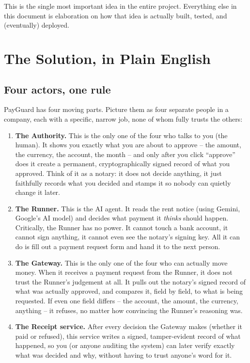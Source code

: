 \documentclass[11pt]{report}
\begin{document}
This is the single most important idea in the entire project. Everything
else in this document is elaboration on how that idea is actually built,
tested, and (eventually) deployed.

\chapter{The Solution, in Plain English}
\label{ch:solution}

\section{Four actors, one rule}

PayGuard has four moving parts. Picture them as four separate people in a
company, each with a specific, narrow job, none of whom fully trusts the
others:

\begin{enumerate}[leftmargin=2em]
  \item \textbf{The Authority.} This is the only one of the four who
        talks to you (the human). It shows you exactly what you are about
        to approve -- the amount, the currency, the account, the month --
        and only after you click ``approve'' does it create a permanent,
        cryptographically signed record of what you approved. Think of it
        as a notary: it does not decide anything, it just faithfully
        records what you decided and stamps it so nobody can quietly
        change it later.
  \item \textbf{The Runner.} This is the AI agent. It reads the rent
        notice (using Gemini, Google's AI model) and decides what payment
        it \emph{thinks} should happen. Critically, the Runner has no
        power. It cannot touch a bank account, it cannot sign anything,
        it cannot even see the notary's signing key. All it can do is
        fill out a payment request form and hand it to the next person.
  \item \textbf{The Gateway.} This is the only one of the four who can
        actually move money. When it receives a payment request from the
        Runner, it does not trust the Runner's judgement at all. It pulls
        out the notary's signed record of what was actually approved, and
        compares it, field by field, to what is being requested. If even
        one field differs -- the account, the amount, the currency,
        anything -- it refuses, no matter how convincing the Runner's
        reasoning was.
  \item \textbf{The Receipt service.} After every decision the Gateway
        makes (whether it paid or refused), this service writes a signed,
        tamper-evident record of what happened, so you (or anyone
        auditing the system) can later verify exactly what was decided
        and why, without having to trust anyone's word for it.
\end{enumerate}
\end{document}
